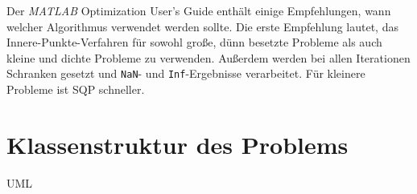 Der \textit{MATLAB} Optimization User's Guide enthält einige Empfehlungen, wann welcher Algorithmus verwendet werden sollte. Die erste Empfehlung lautet, das Innere-Punkte-Verfahren für sowohl große, dünn besetzte Probleme als auch kleine und dichte Probleme zu verwenden. Außerdem werden bei allen Iterationen Schranken gesetzt und \texttt{NaN}- und \texttt{Inf}-Ergebnisse verarbeitet. Für kleinere Probleme ist SQP schneller.


\section{Klassenstruktur des Problems}

UML

